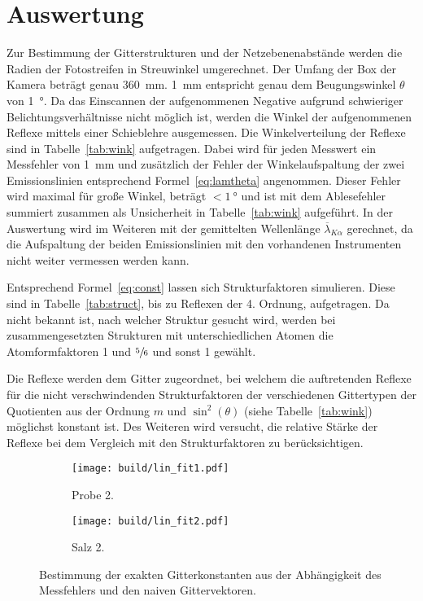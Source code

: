\section{Auswertung}\label{sec:Auswertung}

Zur Bestimmung der Gitterstrukturen und der Netzebenenabstände werden die
Radien der Fotostreifen in Streuwinkel umgerechnet.
Der Umfang der Box der Kamera beträgt genau \SI{360}{\milli\meter}.
\SI{1}{\milli\meter} entspricht genau dem Beugungswinkel $\theta$ von
\SI{1}{\degree}.
Da das Einscannen der aufgenommenen Negative aufgrund schwieriger
Belichtungsverhältnisse nicht möglich ist, werden die Winkel der aufgenommenen
Reflexe mittels einer Schieblehre ausgemessen.
Die Winkelverteilung der Reflexe sind in Tabelle~\ref{tab:wink} aufgetragen.
Dabei wird für jeden Messwert ein Messfehler von \SI{1}{\milli\meter} und
zusätzlich der Fehler der Winkelaufspaltung der zwei Emissionslinien
entsprechend Formel~\eqref{eq:lamtheta} angenommen.
Dieser Fehler wird maximal für große Winkel, beträgt $< \SI{1}{\degree}$ und ist mit dem
Ablesefehler summiert zusammen als Unsicherheit in Tabelle~\ref{tab:wink}
aufgeführt.
In der Auswertung wird im Weiteren mit der gemittelten Wellenlänge
$\overline{\lambda}_{K\alpha}$ gerechnet, da die Aufspaltung der beiden Emissionslinien 
mit den vorhandenen Instrumenten nicht weiter vermessen werden kann.

Entsprechend Formel~\eqref{eq:const} lassen sich Strukturfaktoren simulieren.
Diese sind in Tabelle~\ref{tab:struct}, bis zu Reflexen der 4. Ordnung, aufgetragen.
Da nicht bekannt ist, nach welcher Struktur gesucht wird, werden bei
zusammengesetzten Strukturen mit unterschiedlichen Atomen die Atomformfaktoren
1 und $\sfrac{5}{6}$ und sonst 1 gewählt.

Die Reflexe werden dem Gitter zugeordnet, bei welchem die auftretenden Reflexe für
die nicht verschwindenden Strukturfaktoren der verschiedenen Gittertypen der
Quotienten aus der Ordnung $m$ und $\sin^2(\theta)$ (siehe Tabelle~\ref{tab:wink})
möglichst konstant ist.
Des Weiteren wird versucht, die relative Stärke der Reflexe bei dem Vergleich mit den
Strukturfaktoren zu berücksichtigen.

\begin{figure}[ht]
		\centering
		\begin{subfigure}{0.49\textwidth}
				\centering
				\texttt{[image: build/lin\_fit1.pdf]}
				\caption{Probe 2.}
				\label{fig:prb1}
		\end{subfigure}
		\begin{subfigure}{0.49\textwidth}
				\centering
				\texttt{[image: build/lin\_fit2.pdf]}
				\caption{Salz 2.}
				\label{fig:prb1}
		\end{subfigure}
		\caption{Bestimmung der exakten Gitterkonstanten aus der Abhängigkeit
		des	Messfehlers und den naiven Gittervektoren.}
\end{figure}

